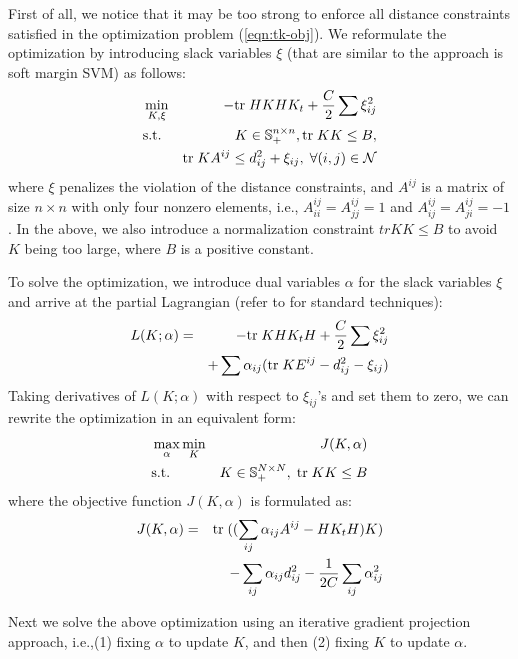 First of all, we notice that it may be too strong to enforce all distance constraints
satisfied in the optimization problem (\ref{eqn:tk-obj}). We reformulate the
optimization by introducing slack variables $\xi$ (that are similar to the approach is
soft margin SVM) as follows:
\begin{eqnarray}
&\min_{K, \xi}& -{\mbox{tr}\;} H K H K_t + \frac{C}{2} \sum \xi_{ij}^2 \\
&\mbox{s.t.}& K \in \mathbb S_+^{n \times n}, {\mbox{tr}\;} KK \leq B, \nonumber\\
&& {\mbox{tr}\;} K A^{ij} \leq d_{ij}^2 + \xi_{ij}, \; \forall (i,j)\in\mathcal N \nonumber
\end{eqnarray}
where $\xi$ penalizes the violation of the distance constraints, and $A^{ij}$ is a matrix of size $n \times n$ with only four nonzero elements, i.e.,
$A^{ij}_{ii} = A^{ij}_{jj} = 1$ and $A^{ij}_{ij} = A^{ij}_{ji} = -1$. In the above, we also introduce a normalization constraint $tr KK \leq B$ to avoid $K$ being too large, where $B$ is a positive constant.

To solve the optimization, we introduce dual variables $\alpha$ for the slack variables $\xi$ and arrive at the
partial Lagrangian (refer to \cite{Boyd} for standard techniques):
\begin{eqnarray}
L(K; \alpha)& =& -{\mbox{tr}\;} K H K_t H + \frac{C}{2} \sum \xi_{ij}^2 \nonumber\\
&&+ \sum \alpha_{ij}({\mbox{tr}\;} K E^{ij} - d_{ij}^2 - \xi_{ij})
\end{eqnarray}
Taking derivatives of $L(K; \alpha)$ with respect to $\xi_{ij}$'s and set them to zero,
we can rewrite the optimization in an equivalent form:
\begin{eqnarray}
&\max_{\alpha} \min_{K}& J(K,\alpha)\\
&\mbox{s.t.}& K \in \mathbb S_+^{N\times N}, \; \tr KK \leq B\nonumber
\label{eqn:tk-dual}
\end{eqnarray}
where the objective function $J(K,\alpha)$ is formulated as:
\begin{eqnarray}
J(K,\alpha)&=&{\mbox{tr}\;}((\sum_{ij} \alpha_{ij} A^{ij} - H K_t H)K)\nonumber\\
&& - \sum_{ij} \alpha_{ij}d_{ij}^2 - \frac{1}{2C} \sum_{ij} \alpha_{ij}^2
\end{eqnarray}

Next we solve the above optimization using an iterative gradient projection approach,
i.e.,(1) fixing $\alpha$ to update $K$, and then (2) fixing $K$ to update $\alpha$.

